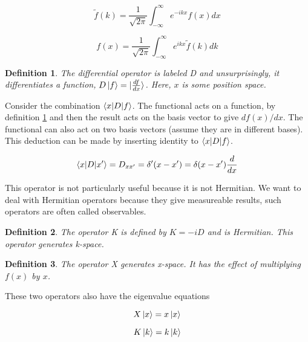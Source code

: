 \documentclass{tufte-book}
\newtheorem{definition}{Definition}
\newcommand{\infint}{\int^{\infty}_{-\infty}}
\begin{document}
\begin{equation}
	\label{eq:10}
	\widetilde{f}(k) = \frac{1}{\sqrt{2\pi}} \infint e^{-ikx}f(x)dx
\end{equation}

\begin{equation}
	\label{eq:11}
	f(x) = \frac{1}{\sqrt{2\pi}} \infint e^{ikx}\widetilde{f}(k)dk
\end{equation}

\begin{definition}
  \label{def:13}
  The differential operator is labeled D and unsurprisingly, it differentiates a function, $D\ket{f} = \ket{\frac{df}{dx}}$. Here, $x$ is some position space.
\end{definition}

Consider the combination $\braket{x|D|f}$. The functional acts on a function, by definition \ref{def:13} and then the result acts on the basis vector to give $df(x)/dx$. The functional can also act on two basis vectors (assume they are in different bases). This deduction can be made by inserting identity to $\braket{x|D|f}$.

\begin{equation}
	\label{eq:12}
	\braket{x|D|x'} = D_{xx'} = \delta'(x-x') = \delta(x-x')\frac{d}{dx}
\end{equation}

This operator is not particularly useful because it is not Hermitian. We want to deal with Hermitian operators because they give measureable results, such operators are often called observables.

\begin{definition}
  \label{def:14}
  The operator K is defined by $K = -iD$ and is Hermitian. This operator generates k-space.
\end{definition}

\begin{definition}
  \label{def:15}
  The operator X generates x-space. It has the effect of multiplying $f(x)$ by $x$.
\end{definition}

These two operators also have the eigenvalue equations

\begin{equation}
	\label{eq:13}
	X\ket{x} = x\ket{x}
\end{equation}

\begin{equation}
	\label{eq:14}
	K\ket{k} = k\ket{k}
\end{equation}
\end{document}
